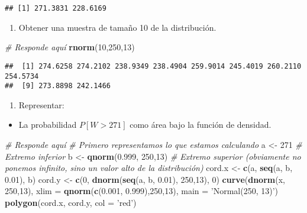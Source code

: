 \documentclass[
]{article}
\newenvironment{Shaded}{\begin{snugshade}}{\end{snugshade}}
\newcommand{\CommentTok}[1]{\textcolor[rgb]{0.56,0.35,0.01}{\textit{#1}}}
\newcommand{\DataTypeTok}[1]{\textcolor[rgb]{0.13,0.29,0.53}{#1}}
\newcommand{\DecValTok}[1]{\textcolor[rgb]{0.00,0.00,0.81}{#1}}
\newcommand{\FloatTok}[1]{\textcolor[rgb]{0.00,0.00,0.81}{#1}}
\newcommand{\KeywordTok}[1]{\textcolor[rgb]{0.13,0.29,0.53}{\textbf{#1}}}
\newcommand{\NormalTok}[1]{#1}
\newcommand{\StringTok}[1]{\textcolor[rgb]{0.31,0.60,0.02}{#1}}
\providecommand{\tightlist}{%
  \setlength{\itemsep}{0pt}\setlength{\parskip}{0pt}}
\begin{document}
\begin{verbatim}
## [1] 271.3831 228.6169
\end{verbatim}

\begin{enumerate}
\def\labelenumi{\arabic{enumi}.}
\setcounter{enumi}{2}
\tightlist
\item
  Obtener una muestra de tamaño 10 de la distribución.
\end{enumerate}

\begin{Shaded}
\begin{Highlighting}[]
\CommentTok{# Responde aquí}
\KeywordTok{rnorm}\NormalTok{(}\DecValTok{10}\NormalTok{,}\DecValTok{250}\NormalTok{,}\DecValTok{13}\NormalTok{)}
\end{Highlighting}
\end{Shaded}

\begin{verbatim}
##  [1] 274.6258 274.2102 238.9349 238.4904 259.9014 245.4019 260.2110 254.5734
##  [9] 273.8898 242.1466
\end{verbatim}

\begin{enumerate}
\def\labelenumi{\arabic{enumi}.}
\setcounter{enumi}{3}
\tightlist
\item
  Representar:
\end{enumerate}

\begin{itemize}
\tightlist
\item
  La probabilidad \(P [W > 271]\) como área bajo la función de densidad.
\end{itemize}

\begin{Shaded}
\begin{Highlighting}[]
\CommentTok{# Responde aquí}
\CommentTok{# Primero representamos lo que estamos calculando}
\NormalTok{a <-}\StringTok{ }\DecValTok{271} \CommentTok{# Extremo inferior}
\NormalTok{b <-}\StringTok{ }\KeywordTok{qnorm}\NormalTok{(}\FloatTok{0.999}\NormalTok{, }\DecValTok{250}\NormalTok{,}\DecValTok{13}\NormalTok{) }\CommentTok{# Extremo superior (obviamente no ponemos infinito, sino un valor alto de la distribución)}
\NormalTok{cord.x <-}\StringTok{ }\KeywordTok{c}\NormalTok{(a, }\KeywordTok{seq}\NormalTok{(a, b, }\FloatTok{0.01}\NormalTok{), b) }
\NormalTok{cord.y <-}\StringTok{ }\KeywordTok{c}\NormalTok{(}\DecValTok{0}\NormalTok{, }\KeywordTok{dnorm}\NormalTok{(}\KeywordTok{seq}\NormalTok{(a, b, }\FloatTok{0.01}\NormalTok{), }\DecValTok{250}\NormalTok{,}\DecValTok{13}\NormalTok{), }\DecValTok{0}\NormalTok{) }
\KeywordTok{curve}\NormalTok{(}\KeywordTok{dnorm}\NormalTok{(x, }\DecValTok{250}\NormalTok{,}\DecValTok{13}\NormalTok{), }\DataTypeTok{xlim =} \KeywordTok{qnorm}\NormalTok{(}\KeywordTok{c}\NormalTok{(}\FloatTok{0.001}\NormalTok{, }\FloatTok{0.999}\NormalTok{),}\DecValTok{250}\NormalTok{,}\DecValTok{13}\NormalTok{), }\DataTypeTok{main =} \StringTok{'Normal(250, 13)'}\NormalTok{) }
\KeywordTok{polygon}\NormalTok{(cord.x, cord.y, }\DataTypeTok{col =} \StringTok{'red'}\NormalTok{)}
\end{Highlighting}
\end{Shaded}
\end{document}
